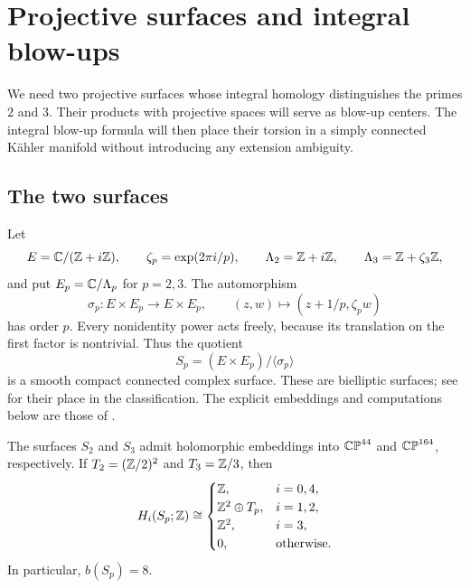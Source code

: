 \section{Projective surfaces and integral blow-ups}
\label{sec:geometry}

We need two projective surfaces whose integral homology distinguishes
the primes $2$ and $3$. Their products with projective spaces will serve
as blow-up centers. The integral blow-up formula will then place their
torsion in a simply connected K\"ahler manifold without introducing any
extension ambiguity.

\subsection{The two surfaces}

Let
\[
 E=\mathbb C/(\mathbb Z+i\mathbb Z),\qquad
 \zeta_p=\exp(2\pi i/p),\qquad
 \Lambda_2=\mathbb Z+i\mathbb Z,\qquad
 \Lambda_3=\mathbb Z+\zeta_3\mathbb Z,
\]
and put $E_p=\mathbb C/\Lambda_p$ for $p=2,3$. The automorphism
\[
 \sigma_p:E\times E_p\longrightarrow E\times E_p,
 \qquad (z,w)\longmapsto(z+1/p,\zeta_p w)
\]
has order $p$. Every nonidentity power acts freely, because its
translation on the first factor is nontrivial. Thus the quotient
\[
 S_p=(E\times E_p)/\langle\sigma_p\rangle
\]
is a smooth compact connected complex surface.
These are bielliptic surfaces; see \cite[Section~2]{Blomme2025} for
their place in the classification. The explicit embeddings and
computations below are those of
\cite[Lemma~3.1]{OpenAI2026Stable}.

\begin{lemma}
\label{geo:surfaces}
The surfaces $S_2$ and $S_3$ admit holomorphic embeddings into
$\mathbb {CP}^{44}$ and $\mathbb {CP}^{164}$, respectively. If
$T_2=(\mathbb Z/2)^2$ and $T_3=\mathbb Z/3$, then
\begin{equation}
\label{geo:surface-homology}
 H_i(S_p;\mathbb Z)\cong
 \begin{cases}
  \mathbb Z,&i=0,4,\\
  \mathbb Z^2\oplus T_p,&i=1,2,\\
  \mathbb Z^2,&i=3,\\
  0,&\text{otherwise}.
 \end{cases}
\end{equation}
In particular, $b(S_p)=8$.
\end{lemma}

